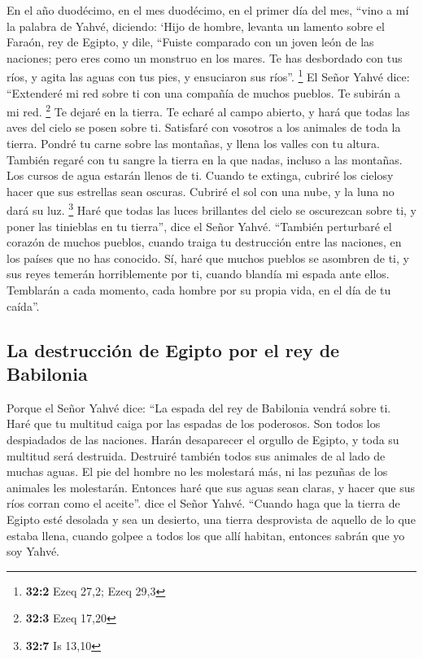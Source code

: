 \begin{paracol}{2}
 En el año duodécimo, en el mes duodécimo, en el primer
día del mes, ``vino a mí la palabra de Yahvé, diciendo: 
`Hijo de hombre, levanta un lamento sobre el Faraón, rey de Egipto, y
dile, ``Fuiste comparado con un joven león de las naciones; pero eres
como un monstruo en los mares. Te has desbordado con tus ríos, y agita
las aguas con tus pies, y ensuciaron sus ríos''. \footnote{\textbf{32:2}
  Ezeq 27,2; Ezeq 29,3}  El Señor Yahvé dice: ``Extenderé
mi red sobre ti con una compañía de muchos pueblos. Te subirán a mi red.
\footnote{\textbf{32:3} Ezeq 17,20}  Te dejaré en la
tierra. Te echaré al campo abierto, y hará que todas las aves del cielo
se posen sobre ti. Satisfaré con vosotros a los animales de toda la
tierra.  Pondré tu carne sobre las montañas, y llena los
valles con tu altura.  También regaré con tu sangre la
tierra en la que nadas, incluso a las montañas. Los cursos de agua
estarán llenos de ti.  Cuando te extinga, cubriré los
cielosy hacer que sus estrellas sean oscuras. Cubriré el sol con una
nube, y la luna no dará su luz. \footnote{\textbf{32:7} Is 13,10}
 Haré que todas las luces brillantes del cielo se
oscurezcan sobre ti, y poner las tinieblas en tu tierra'', dice el Señor
Yahvé.  ``También perturbaré el corazón de muchos pueblos,
cuando traiga tu destrucción entre las naciones, en los países que no
has conocido.  Sí, haré que muchos pueblos se asombren de
ti, y sus reyes temerán horriblemente por ti, cuando blandía mi espada
ante ellos. Temblarán a cada momento, cada hombre por su propia vida, en
el día de tu caída''.

\hypertarget{la-destrucciuxf3n-de-egipto-por-el-rey-de-babilonia}{%
\subsection{La destrucción de Egipto por el rey de
Babilonia}\label{la-destrucciuxf3n-de-egipto-por-el-rey-de-babilonia}}

 Porque el Señor Yahvé dice: ``La espada del rey de
Babilonia vendrá sobre ti.  Haré que tu multitud caiga
por las espadas de los poderosos. Son todos los despiadados de las
naciones. Harán desaparecer el orgullo de Egipto, y toda su multitud
será destruida.  Destruiré también todos sus animales de
al lado de muchas aguas. El pie del hombre no les molestará más, ni las
pezuñas de los animales les molestarán.  Entonces haré
que sus aguas sean claras, y hacer que sus ríos corran como el aceite''.
dice el Señor Yahvé.  ``Cuando haga que la tierra de
Egipto esté desolada y sea un desierto, una tierra desprovista de
aquello de lo que estaba llena, cuando golpee a todos los que allí
habitan, entonces sabrán que yo soy Yahvé.


\end{paracol}
